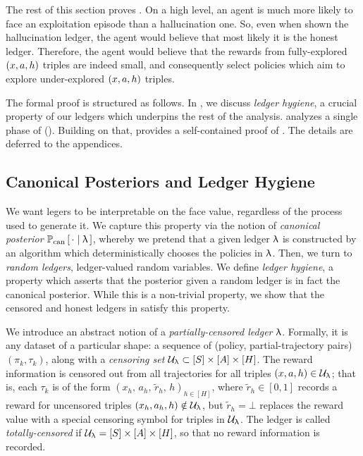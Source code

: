 The rest of this section proves . On a high level, an agent is much more likely to face an exploitation episode than a hallucination one. So, even when shown the hallucination ledger, the agent would believe that most likely it is the honest ledger. Therefore, the agent would believe that the rewards from fully-explored $(x,a,h)$ triples are indeed small, and consequently select policies which aim to explore under-explored $(x,a,h)$ triples.

The formal proof is structured as follows. In , we discuss \emph{ledger hygiene}, a crucial property of our ledgers which underpins the rest of the analysis.  analyzes a single phase of \mdphh (). Building on that,  provides a self-contained proof of . The details are deferred to the appendices.

\subsection{Canonical Posteriors and Ledger Hygiene}
\label{sec:canon}

We want legers to be interpretable on the face value, regardless of the process used to generate it. We capture this property via the notion of \emph{canonical posterior} $\operatorname{\mathbb{P}}_{\mathrm{can}}\left[\, \cdot \mid \uplambda \,\right]$, whereby we pretend that a given ledger $\uplambda$ is constructed by an algorithm which deterministically chooses the policies in $\uplambda$. Then, we turn to \emph{random ledgers}, \ie ledger-valued random variables. We define \emph{ledger hygiene}, a  property which asserts that the posterior given a random ledger is in fact the canonical posterior. While this is a non-trivial property, we show that the censored and honest ledgers in \mdphh satisfy this property.

We introduce an abstract notion of a \emph{partially-censored ledger} $\uplambda$. Formally,
it is any dataset of a particular shape: a sequence of (policy, partial-trajectory pairs) $(\pi_k,\tau_k)$,  along with a \emph{censoring set} $\mathcal{U}_{\uplambda} \subset [S]\times[A]\times[H]$. The reward information is censored out from all trajectories for all triples $(x,a,h)\in \mathcal{U}_{\uplambda}$; that is, each $\tau_k$ is of the form $(x_h,\,a_h,\, \tilde{r}_h,\,h)_{h\in[H]}$, where $\tilde{r}_h \in [0,1]$ records a reward for uncensored triples $(x_h,a_h,h) \notin \mathcal{U}_{\uplambda}$, but $\tilde{r}_h = \bot$ replaces the reward value with a special censoring symbol for triples in $\mathcal{U}_{\uplambda}$.
 The ledger is called \emph{totally-censored} if
    $\mathcal{U}_\uplambda = [S]\times[A]\times[H]$, so that no reward information is recorded.

